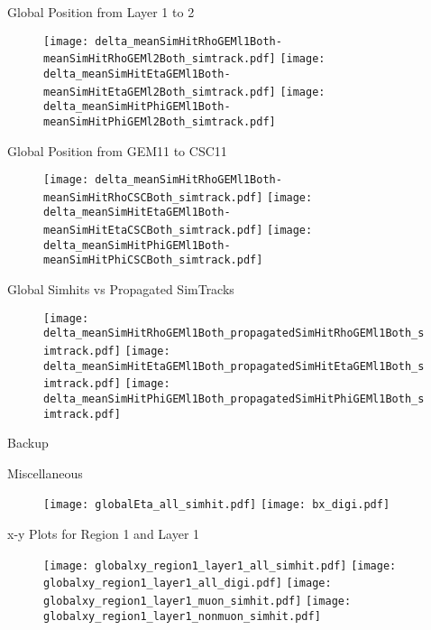 \documentclass[11pt,a4paper]{beamer}
\begin{document}
\begin{frame}{Global Position from Layer 1 to 2}
\begin{figure}[htbp]
\hfill
\texttt{[image: delta\_meanSimHitRhoGEMl1Both-meanSimHitRhoGEMl2Both\_simtrack.pdf]} 
\hfill
\texttt{[image: delta\_meanSimHitEtaGEMl1Both-meanSimHitEtaGEMl2Both\_simtrack.pdf]}
\hfill
\texttt{[image: delta\_meanSimHitPhiGEMl1Both-meanSimHitPhiGEMl2Both\_simtrack.pdf]} 
\hfill
\end{figure}
\end{frame}

\begin{frame}{Global Position from GEM11 to CSC11}
\begin{figure}[htbp]
\hfill
\texttt{[image: delta\_meanSimHitRhoGEMl1Both-meanSimHitRhoCSCBoth\_simtrack.pdf]} 
\hfill
\texttt{[image: delta\_meanSimHitEtaGEMl1Both-meanSimHitEtaCSCBoth\_simtrack.pdf]}
\hfill
\texttt{[image: delta\_meanSimHitPhiGEMl1Both-meanSimHitPhiCSCBoth\_simtrack.pdf]}
\hfill
\end{figure}
\end{frame}

\begin{frame}{Global Simhits vs Propagated SimTracks}
\begin{figure}[htbp]
\hfill
\texttt{[image: delta\_meanSimHitRhoGEMl1Both\_propagatedSimHitRhoGEMl1Both\_simtrack.pdf]} 
\hfill
\texttt{[image: delta\_meanSimHitEtaGEMl1Both\_propagatedSimHitEtaGEMl1Both\_simtrack.pdf]}
\hfill
\texttt{[image: delta\_meanSimHitPhiGEMl1Both\_propagatedSimHitPhiGEMl1Both\_simtrack.pdf]} 
\hfill
\end{figure}
\end{frame}

\begin{frame}{Backup}
\end{frame}

\begin{frame}{Miscellaneous}
\begin{figure}[htbp]
\hfill
\texttt{[image: globalEta\_all\_simhit.pdf]} 
\hfill
\texttt{[image: bx\_digi.pdf]}
\hfill
\end{figure}
\end{frame}

\begin{frame}{x-y Plots for Region 1 and Layer 1}
\begin{figure}[htbp]
\hill
\texttt{[image: globalxy\_region1\_layer1\_all\_simhit.pdf]} 
\hfill
\texttt{[image: globalxy\_region1\_layer1\_all\_digi.pdf]}
\hfill
\texttt{[image: globalxy\_region1\_layer1\_muon\_simhit.pdf]} 
\hfill
\texttt{[image: globalxy\_region1\_layer1\_nonmuon\_simhit.pdf]}
\hfill
\end{figure}
\end{frame}
\end{document}
